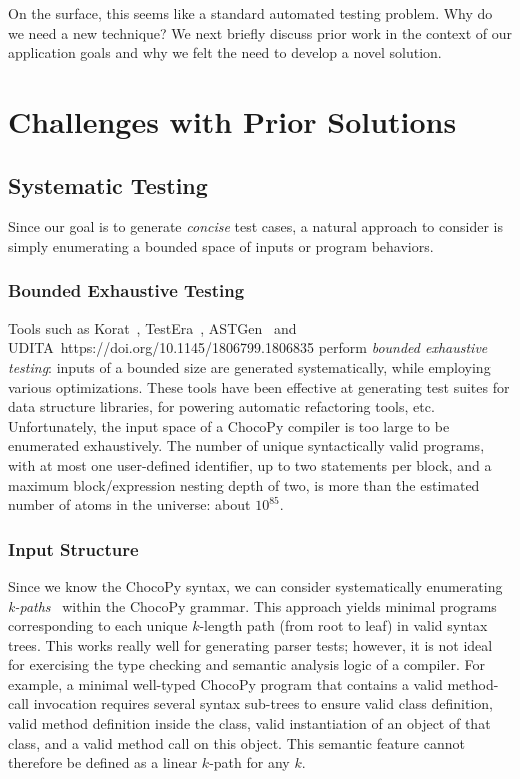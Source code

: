 \documentclass[conference]{IEEEtran}
\begin{document}
On the surface, this seems like a standard automated testing problem. Why do we need a new technique? We next briefly discuss prior work in the context of our application goals and why we felt the need to develop a novel solution.
 
\section{Challenges with Prior Solutions}
\label{sec:related}

\subsection{Systematic Testing}

Since our goal is to generate \emph{concise} test cases, a  natural approach to consider is simply enumerating a bounded space of inputs or program behaviors.

\subsubsection{Bounded Exhaustive Testing}

Tools such as Korat~\cite{Boyapati02}, TestEra~\cite{Khurshid04}, ASTGen~\cite{Daniel07} and UDITA~https://doi.org/10.1145/1806799.1806835 perform \emph{bounded exhaustive testing}: inputs of a bounded size are generated systematically, while employing various optimizations. These tools have been effective at generating test suites for data structure libraries, for powering automatic refactoring tools, etc. Unfortunately, the input space of a ChocoPy compiler is too large to be enumerated exhaustively. The number of unique syntactically valid programs, with at most one user-defined identifier, up to two statements per block, and a maximum block/expression nesting depth of two, is more than the estimated number of atoms in the universe: about $10^{85}$.

\subsubsection{Input Structure}

Since we know the ChocoPy syntax, we can consider systematically enumerating \emph{k-paths}~\cite{Havrikov19} within the ChocoPy grammar. This approach yields minimal programs corresponding to each unique $k$-length path (from root to leaf) in valid syntax trees. This works really well for generating parser tests; however, it is not ideal for exercising the type checking and semantic analysis logic of a compiler. For example, a minimal well-typed ChocoPy program that contains a valid method-call invocation requires several syntax sub-trees to ensure valid class definition, valid method definition inside the class, valid instantiation of an object of that class, and a valid method call on this object. This semantic feature cannot therefore be defined as a linear $k$-path for any $k$. 
\end{document}
